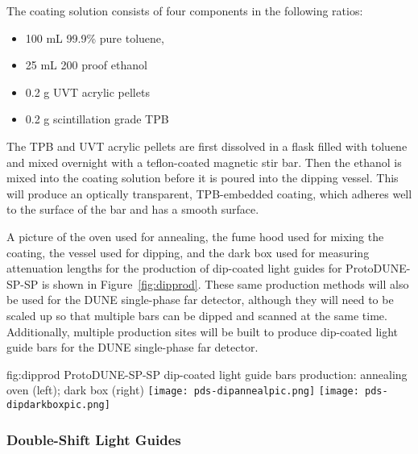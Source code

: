 The coating solution consists of four components in the following ratios:

\begin{itemize}
\item 100 mL 99.9\% pure toluene,
\item 25 mL 200 proof ethanol
\item 0.2 g UVT acrylic pellets
\item 0.2 g scintillation grade TPB
\end{itemize}

The TPB and UVT acrylic pellets are first dissolved in a flask filled with toluene and mixed overnight with a teflon-coated magnetic stir bar.  Then the ethanol is mixed into the coating solution before it is poured into the dipping vessel.  This will produce an optically transparent, TPB-embedded coating, which adheres well to the surface of the bar and has a smooth surface.

A picture of the oven used for annealing, the fume hood used for mixing the coating, the vessel used for dipping, and the dark box used for measuring attenuation lengths for the production of dip-coated light guides for ProtoDUNE-SP-SP is shown in Figure~\ref{fig:dipprod}.  These same production methods will also be used for the DUNE single-phase far detector, although they will need to be scaled up so that multiple bars can be dipped and scanned at the same time.  Additionally, multiple production sites will be built to produce dip-coated light guide bars for the DUNE single-phase far detector.

\begin{dunefigure}{fig:dipprod}
{ProtoDUNE-SP-SP dip-coated light guide bars production: annealing oven (left); dark box (right)}
  \texttt{[image: pds-dipannealpic.png]}
  \texttt{[image: pds-dipdarkboxpic.png]}
\end{dunefigure}




\subsubsection{Double-Shift Light Guides}
\label{ssec:fdsp-pd-pc-prod-bar2}


